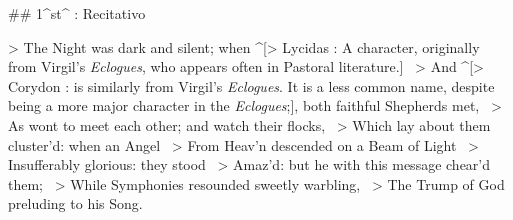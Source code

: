 ## 1^st^ \mvmt: Recitativo


> The Night was dark and silent; when ^[> Lycidas : A character, originally from Virgil's \textit{Eclogues}, who appears often in Pastoral literature.] \
> And ^[> Corydon : is similarly from Virgil's \textit{Eclogues}. It is a less common name, despite being a more major character in the \textit{Eclogues};], both faithful Shepherds met,  \
> As wont to meet each other; and watch their flocks,  \
> Which lay about them cluster’d: when an Angel  \
> From Heav’n descended on a Beam of Light  \
> Insufferably glorious: they stood  \
> Amaz’d: but he with this message chear’d them;  \
> While Symphonies resounded sweetly warbling,  \
> The Trump of God preluding to his Song.

